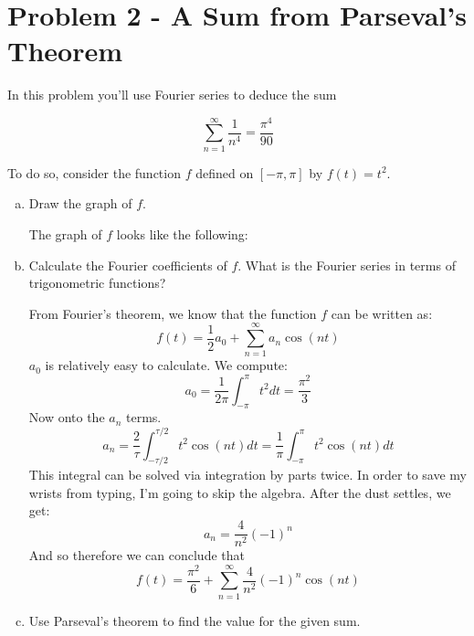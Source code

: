 \documentclass[10pt]{article}
\begin{document}
    \pagebreak

    \section*{Problem 2 - A Sum from Parseval's Theorem}

    In this problem you'll use Fourier series to deduce the sum

    \[ \sum_{n = 1}^\infty \frac{1}{n^4} = \frac{\pi^4}{90}\] 

    To do so, consider the function $f$ defined on $[-\pi, \pi]$ by $f(t) = t^2$. 

    \begin{enumerate}[(a)]
        \item Draw the graph of $f$. 

        \begin{solution}
            The graph of $f$ looks like the following:
            \begin{center}
            \end{center}
        \end{solution}
        \item Calculate the Fourier coefficients of $f$. What is the Fourier series in terms of trigonometric functions?
        
        \begin{solution}
            From Fourier's theorem, we know that the function $f$ can be written as: 
            \[ f(t) = \frac{1}{2} a_0 + \sum_{n= 1}^\infty a_n \cos(nt)\]
            $a_0$ is relatively easy to calculate. We compute: 
            \[ a_0 = \frac{1}{2\pi}\int_{-\pi}^\pi t^2 dt = \frac{\pi^2}{3}\] 
            Now onto the $a_n$ terms.
            \[ a_n = \frac{2}{\tau} \int_{-\tau/2}^{\tau/2} t^2 \cos (nt) dt = \frac{1}{\pi} \int_{-\pi}^\pi t^2 \cos(nt) dt\]
            This integral can be solved via integration by parts twice. In order to save my wrists from typing, I'm going to skip the algebra. After the dust settles, we get:
            \[ a_n = \frac{4}{n^2}(-1)^n\]  
            And so therefore we can conclude that 
            \[ f(t) = \frac{\pi^2}{6} + \sum_{n = 1}^\infty \frac{4}{n^2} (-1)^n \cos(nt)\] 
        \end{solution}
        \item Use Parseval's theorem to find the value for the given sum. 
        

\end{enumerate}
\end{document}
